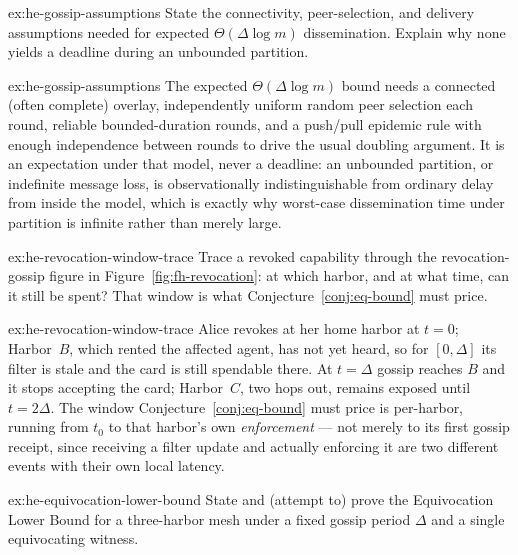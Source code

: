 \documentclass[11pt,a4paper]{article}
\theoremstyle{definition}
\theoremstyle{definition}
\theoremstyle{remark}
\begin{document}
\begin{pdexercise}[kind=Check,rating=1]{ex:he-gossip-assumptions}
State the connectivity, peer-selection, and delivery assumptions needed for
  expected $\Theta(\Delta\log m)$ dissemination. Explain why none yields a deadline
  during an unbounded partition.
\end{pdexercise}
\begin{pdsolution}{ex:he-gossip-assumptions}
The expected $\Theta(\Delta\log m)$ bound needs a connected (often complete)
overlay, independently uniform random peer selection each round, reliable
bounded-duration rounds, and a push/pull epidemic rule with enough independence
between rounds to drive the usual doubling argument. It is an expectation under
that model, never a deadline: an unbounded partition, or indefinite message
loss, is observationally indistinguishable from ordinary delay from inside the
model, which is exactly why worst-case dissemination time under partition is
infinite rather than merely large.
\end{pdsolution}
\begin{pdexercise}[kind=Trace,rating=2]{ex:he-revocation-window-trace}
Trace a revoked capability through \ifpdbook the revocation-gossip figure in \else Figure~\ref{fig:fh-revocation}\fi: at which
  harbor, and at what time, can it still be spent? That window is what
  Conjecture~\ref{conj:eq-bound} must price.
\end{pdexercise}
\begin{pdsolution}{ex:he-revocation-window-trace}
Alice revokes at her home harbor at $t=0$; Harbor~$B$, which rented the
affected agent, has not yet heard, so for $[0,\Delta]$ its filter is stale and
the card is still spendable there. At $t=\Delta$ gossip reaches $B$ and it stops
accepting the card; Harbor~$C$, two hops out, remains exposed until $t=2\Delta$.
The window Conjecture~\ref{conj:eq-bound} must price is per-harbor, running from
$t_0$ to that harbor's own \emph{enforcement} --- not merely to its first gossip
receipt, since receiving a filter update and actually enforcing it are two
different events with their own local latency.
\end{pdsolution}
\begin{pdexercise}[kind=Open,rating=3]{ex:he-equivocation-lower-bound}
State and (attempt to) prove the Equivocation Lower Bound for a
  three-harbor mesh under a fixed gossip period $\Delta$ and a single equivocating
  witness.
\end{pdexercise}
\end{document}
